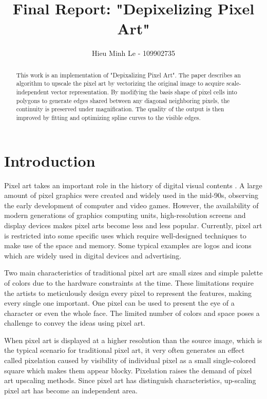 \documentclass{article}
\title{Final Report: "Depixelizing Pixel Art"}
\author{Hieu Minh Le - 109902735}
\begin{document}
\maketitle
\begin{abstract}
This work is an implementation of "Depixalizing Pixel Art". The paper describes an algorithm to upscale the pixel art by vectorizing the original image to acquire scale-independent vector representation. By modifying the basis shape of pixel cells into polygons to generate edges shared between any diagonal neighboring pixels, the continuity is preserved under magnification. The quality of the output is then improved by fitting and optimizing spline curves to the visible edges.
\end{abstract}
\section{Introduction}
Pixel art takes an important role in the history of digital visual contents . A large amount of pixel graphics were created and widely used in the mid-90s, observing the early development of computer and video games.  However, the availability of modern generations of graphics computing units, high-resolution screens and display devices makes pixel arts become less and less popular.  Currently, pixel art is restricted into some specific uses which require well-designed techniques to make use of the space and memory. Some typical examples are logos and icons which are widely used in digital devices and advertising. 

Two main characteristics of traditional pixel art are small sizes and simple palette of colors due to the hardware constraints at the time. These limitations require the artists to meticulously design every pixel to represent the features, making every single one important. One pixel can be used to present the eye of a character or even the whole face. The limited number of colors and space poses a challenge to convey the ideas using pixel art.

When pixel art is displayed at a higher resolution than the source image, which is the typical scenario for traditional pixel art, it very often generates an effect called pixelation caused by visibility of individual pixel as a small single-colored square which makes them appear blocky. Pixelation raises the demand of pixel art upscaling methods. Since pixel art has distinguish characteristics, up-scaling pixel art has become an independent area.
\end{document}
